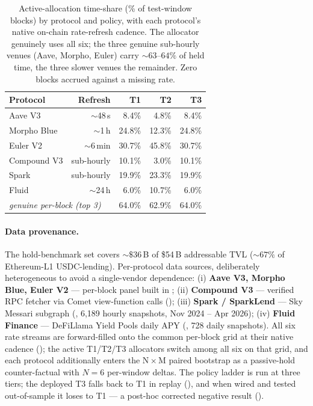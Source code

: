 \begin{table}[t]
  \centering
  \caption{Active-allocation time-share (\% of test-window blocks)
    by protocol and policy, with each protocol's native on-chain
    rate-refresh cadence.  The allocator genuinely uses all six;
    the three genuine sub-hourly venues (Aave, Morpho, Euler) carry
    $\sim 63$--$64\%$ of held time, the three slower venues the
    remainder.  Zero blocks accrued against a missing rate.}
  \label{tab:timeshare}
  \setlength{\tabcolsep}{4pt}
  \begin{tabular}{lrrrr}
    \toprule
    Protocol & Refresh & T1 & T2 & T3 \\
    \midrule
    Aave V3      & $\sim$48\,s  & 8.4\%  & 4.8\%  & 8.4\% \\
    Morpho Blue  & $\sim$1\,h   & 24.8\% & 12.3\% & 24.8\% \\
    Euler V2     & $\sim$6\,min & 30.7\% & 45.8\% & 30.7\% \\
    Compound V3  & sub-hourly   & 10.1\% & 3.0\%  & 10.1\% \\
    Spark        & sub-hourly   & 19.9\% & 23.3\% & 19.9\% \\
    Fluid        & $\sim$24\,h  & 6.0\%  & 10.7\% & 6.0\% \\
    \midrule
    \multicolumn{2}{l}{\emph{genuine per-block (top 3)}}
                 & 64.0\% & 62.9\% & 64.0\% \\
    \bottomrule
  \end{tabular}
\end{table}

\paragraph{Data provenance.}
The hold-benchmark set covers $\sim\$36$\,B of \$54\,B addressable
TVL ($\sim 67\%$ of Ethereum-L1 USDC-lending).  Per-protocol
data sources, deliberately heterogeneous to avoid a single-vendor
dependence:
(i) \textbf{Aave V3, Morpho Blue, Euler V2} — per-block panel built
in ;
(ii) \textbf{Compound V3} — verified RPC fetcher via Comet
view-function calls ();
(iii) \textbf{Spark / SparkLend} — Sky Messari subgraph
(, 6{,}189 hourly snapshots,
Nov 2024 -- Apr 2026);
(iv) \textbf{Fluid Finance} — DeFiLlama Yield Pools daily APY
(, 728 daily snapshots).
All six rate streams are forward-filled onto the common per-block
grid at their native cadence (); the active
T1/T2/T3 allocators switch among all six on that grid, and each
protocol additionally enters the N\,$\times$\,M paired bootstrap as
a passive-hold counter-factual with $N=6$ per-window deltas.  The
policy ladder is run at three tiers; the deployed T3 falls back to
T1 in replay (), and when wired and tested
out-of-sample it loses to T1 --- a post-hoc corrected negative result
().

